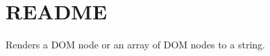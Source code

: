 \chapter{README}
\hypertarget{md_pkiclassroomrescheduler_2src_2main_2frontend_2node__modules_2svgo_2node__modules_2dom-serializer_2_r_e_a_d_m_e}{}\label{md_pkiclassroomrescheduler_2src_2main_2frontend_2node__modules_2svgo_2node__modules_2dom-serializer_2_r_e_a_d_m_e}
Renders a DOM node or an array of DOM nodes to a string. 